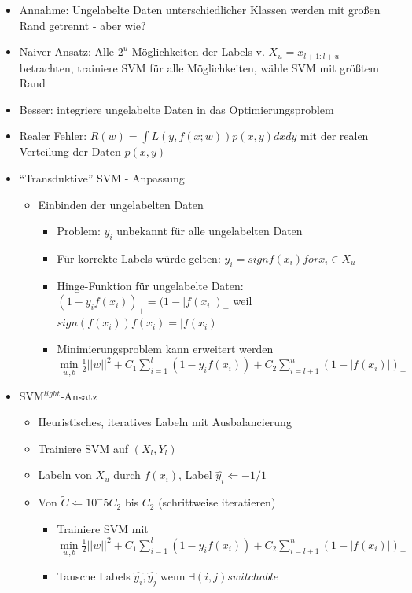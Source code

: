 \documentclass[paper=a4, fontsize=11pt]{scrartcl} %
\numberwithin{equation}{section} %
\numberwithin{figure}{section} %
\numberwithin{table}{section} %
\begin{document}
\begin{itemize}
\item Annahme: Ungelabelte Daten unterschiedlicher Klassen werden mit großen Rand getrennt - aber wie?
\item Naiver Ansatz: Alle $2^u$ Möglichkeiten der Labels v. $X_u = {x_{l+1:l+u}}$ betrachten, trainiere SVM für alle Möglichkeiten, wähle SVM mit größtem Rand
\item Besser: integriere ungelabelte Daten in das Optimierungsproblem
\item Realer Fehler: $R(w) = \int L(y, f(x; w)) p(x,y) dxdy$ mit der realen Verteilung der Daten $p(x,y)$
\item ``Transduktive'' SVM - Anpassung
\begin{itemize}
\item Einbinden der ungelabelten Daten
\begin{itemize}
\item Problem: $y_i$ unbekannt für alle ungelabelten Daten
\item Für korrekte Labels würde gelten: $y_i = sign f(x_i) for x_i \in X_u$
\item Hinge-Funktion für ungelabelte Daten: $(1-y_i f(x_i))_+ = (1 - |f(x_i|)_+$ weil $sign(f(x_i)) f(x_i) = |f(x_i)|$
\item Minimierungsproblem kann erweitert werden\\ $\min\limits_{w,b} {\frac{1}{2}||w||^2 + C_1 \sum\limits_{i=1}^{l}(1-y_i f(x_i)) + C_2 \sum\limits_{i=l+1}^n (1-|f(x_i)|)_+}$
\end{itemize}
\end{itemize}
\item SVM$^{light}$-Ansatz
\begin{itemize}
\item Heuristisches, iteratives Labeln mit Ausbalancierung
\item Trainiere SVM auf $(X_l, Y_l)$
\item Labeln von $X_u$ durch $f(x_i)$, Label $\hat{y_i} \Leftarrow -1/1$
\item Von $\tilde{C} \Leftarrow 10^-5 C_2$ bis $C_2$ (schrittweise iteratieren)
\begin{itemize}
\item Trainiere SVM mit\\ $\min\limits_{w,b} {\frac{1}{2}||w||^2 + C_1 \sum\limits_{i=1}^{l}(1-y_i f(x_i)) + C_2 \sum\limits_{i=l+1}^n (1-|f(x_i)|)_+}$
\item Tausche Labels $\hat{y_i}, \hat{y_j}$ wenn $\exists(i,j) switchable$
\end{itemize}

\end{itemize}
\end{itemize}
\end{document}
